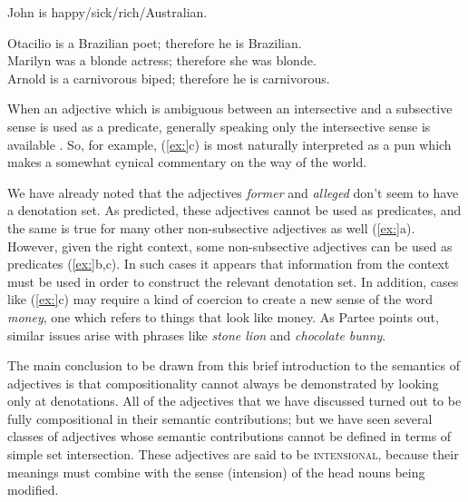 \ea
John is happy/sick/rich/Australian.
\z

\ea
\ea Otacilio is a Brazilian poet; therefore he is Brazilian.\\
\ex Marilyn was a blonde actress; therefore she was blonde.\\
\ex Arnold is a carnivorous biped; therefore he is carnivorous.
                       \z
\z


When an adjective which is ambiguous between an intersective and a subsective sense is used as a predicate, generally speaking only the intersective sense is available . So, for example, (\ref{ex:}c) is most naturally interpreted as a pun which makes a somewhat cynical commentary on the way of the world.


\ea
{}
                       \z
\z


We have already noted that the adjectives \textit{former} and \textit{alleged} don’t seem to have a denotation set. As predicted, these adjectives cannot be used as predicates, and the same is true for many other non-subsective adjectives as well (\ref{ex:}a). However, given the right context, some non-subsective adjectives can be used as predicates (\ref{ex:}b,c). In such cases it appears that information from the context must be used in order to construct the relevant denotation set. In addition, cases like (\ref{ex:}c) may require a kind of coercion to create a new sense of the word \textit{money}, one which refers to things that look like money. As Partee points out, similar issues arise with phrases like \textit{stone lion} and \textit{chocolate bunny}.


\ea
{}
                       \z
\z


The main conclusion to be drawn from this brief introduction to the semantics of adjectives is that compositionality cannot always be demonstrated by looking only at denotations. All of the adjectives that we have discussed turned out to be fully compositional in their semantic contributions; but we have seen several classes of adjectives whose semantic contributions cannot be defined in terms of simple set intersection. These adjectives are said to be \textsc{intensional}, because their meanings must combine with the sense (intension) of the head nouns being modified.



